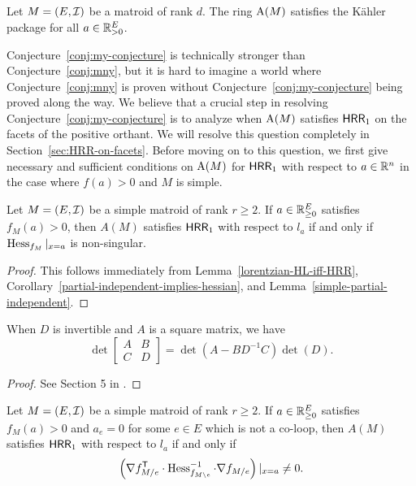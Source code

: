 \documentclass{puthesis-UG}
\begin{document}
\begin{conj} \label{conj:my-conjecture}
	Let $M = (E, \mathcal{I})$ be a matroid of rank $d$. The ring $\operatorname{A}(M)$ satisfies the K\"ahler package for all $a \in \mathbb{R}^E_{> 0}$.
\end{conj}

Conjecture~\ref{conj:my-conjecture} is technically stronger than Conjecture~\ref{conj:mny}, but it is hard to imagine a world where Conjecture~\ref{conj:mny} is proven without Conjecture~\ref{conj:my-conjecture} being proved along the way. We believe that a crucial step in resolving Conjecture~\ref{conj:my-conjecture} is to analyze when $\operatorname{A}(M)$ satisfies $\mathsf{HRR}_1$ on the facets of the positive orthant. We will resolve this question completely in Section~\ref{sec:HRR-on-facets}. Before moving on to this question, we first give necessary and sufficient conditions on $\operatorname{A}(M)$ for $\mathsf{HRR}_1$ with respect to $a \in \mathbb{R}^n$ in the case where $f(a) > 0$ and $M$ is simple.

\begin{cor} \label{simple-matroids-HRR-condition}
	Let $M = (E, \mathcal{I})$ be a simple matroid of rank $r \geq 2$. If $a \in \mathbb{R}_{\geq 0}^E$ satisfies $f_M(a) > 0$, then $A(M)$ satisfies $\mathsf{HRR}_1$ with respect to $l_a$ if and only if $\operatorname{Hess}_{f_M} |_{x = a}$ is non-singular.
\end{cor} 

\begin{proof}
	This follows immediately from Lemma~\ref{lorentzian-HL-iff-HRR}, Corollary~\ref{partial-independent-implies-hessian}, and Lemma~\ref{simple-partial-independent}.
\end{proof}

\begin{lem} \label{block-matrix-determinant-calculation}
		When $D$ is invertible and $A$ is a square matrix, we have
		\[
			\det \begin{bmatrix} A & B \\ C & D \end{bmatrix} = \det (A - B D^{-1} C) \det (D).
		\]
	\end{lem}
	\begin{proof}
		See Section 5 in \cite{block-matrices}.
	\end{proof}

\begin{thm} \label{thm:simple-inverse-hessian-property}
	Let $M = (E, \mathcal{I})$ be a simple matroid of rank $r \geq 2$. If $a \in \mathbb{R}_{\geq 0}^E$ satisfies $f_M(a) > 0$ and $a_e = 0$ for some $e \in E$ which is not a co-loop, then $A(M)$ satisfies $\mathsf{HRR}_1$ with respect to $l_a$ if and only if 
	\[
		\left ( \nabla f_{M / e}^{\mathsf{T}} \cdot \operatorname{Hess}^{-1}_{f_{M \backslash e}} \cdot \nabla f_{M / e} \right ) |_{x = a} \neq 0.
	\]
\end{thm}
\end{document}
